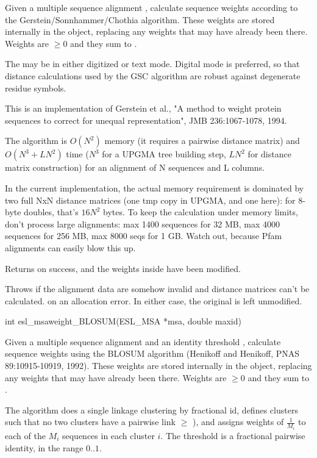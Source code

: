 \begin{sreapi}
Given a multiple sequence alignment , calculate
sequence weights according to the
Gerstein/Sonnhammer/Chothia algorithm. These weights
are stored internally in the  object, replacing
any weights that may have already been there. Weights
are $\geq 0$ and they sum to .

The  may be in either digitized or text mode.
Digital mode is preferred, so that distance calculations
used by the GSC algorithm are robust against degenerate
residue symbols.

This is an implementation of Gerstein et al., "A method to
weight protein sequences to correct for unequal
representation", JMB 236:1067-1078, 1994.

The algorithm is $O(N^2)$ memory (it requires a pairwise
distance matrix) and $O(N^3 + LN^2)$ time ($N^3$ for a UPGMA
tree building step, $LN^2$ for distance matrix construction)
for an alignment of N sequences and L columns. 

In the current implementation, the actual memory
requirement is dominated by two full NxN distance
matrices (one tmp copy in UPGMA, and one here): for
8-byte doubles, that's $16N^2$ bytes. To keep the
calculation under memory limits, don't process large
alignments: max 1400 sequences for 32 MB, max 4000
sequences for 256 MB, max 8000 seqs for 1 GB. Watch
out, because Pfam alignments can easily blow this up.

Returns  on success, and the weights inside  have been
modified.  

Throws  if the alignment data are somehow invalid and
distance matrices can't be calculated.  on an
allocation error. In either case, the original  is
left unmodified.



\hypertarget{func:esl_msaweight_BLOSUM()}
{\item[int esl\_msaweight\_BLOSUM(ESL\_MSA *msa, double maxid)]}

Given a multiple sequence alignment  and an identity
threshold , calculate sequence weights using the
BLOSUM algorithm (Henikoff and Henikoff, PNAS
89:10915-10919, 1992). These weights are stored
internally in the  object, replacing any weights
that may have already been there. Weights are $\geq 0$
and they sum to .

The algorithm does a single linkage clustering by
fractional id, defines clusters such that no two clusters
have a pairwise link $\geq$ ), and assigns
weights of $\frac{1}{M_i}$ to each of the $M_i$
sequences in each cluster $i$. The  threshold
is a fractional pairwise identity, in the range
$0..1$.


\end{sreapi}
